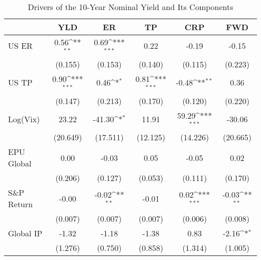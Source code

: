 \begin{table}[htbp]\centering
\def\sym#1{\ifmmode^{#1}\else\(^{#1}\)\fi}
\caption{Drivers of the 10-Year Nominal Yield and Its Components}
\label{tab:ycdcmp10y}
\begin{tabular*}{0.8\hsize}{@{\hskip\tabcolsep\extracolsep\fill}l*{5}{c}}
\toprule
                    &\multicolumn{1}{c}{YLD}&\multicolumn{1}{c}{ER}&\multicolumn{1}{c}{TP}&\multicolumn{1}{c}{CRP}&\multicolumn{1}{c}{FWD}\\
\midrule
US ER               &        0.56\sym{**} &        0.69\sym{***}&        0.22         &       -0.19         &       -0.15         \\
                    &     (0.155)         &     (0.153)         &     (0.140)         &     (0.115)         &     (0.223)         \\
\addlinespace
US TP               &        0.90\sym{***}&        0.46\sym{*}  &        0.81\sym{***}&       -0.48\sym{**} &        0.36         \\
                    &     (0.147)         &     (0.213)         &     (0.170)         &     (0.120)         &     (0.220)         \\
\addlinespace
Log(Vix)            &       23.22         &      -41.30\sym{*}  &       11.91         &       59.29\sym{***}&      -30.06         \\
                    &    (20.649)         &    (17.511)         &    (12.125)         &    (14.226)         &    (20.665)         \\
\addlinespace
EPU Global          &        0.00         &       -0.03         &        0.05         &       -0.05         &        0.02         \\
                    &     (0.206)         &     (0.127)         &     (0.053)         &     (0.111)         &     (0.170)         \\
\addlinespace
S\&P Return         &       -0.00         &       -0.02\sym{**} &       -0.01         &        0.02\sym{***}&       -0.03\sym{**} \\
                    &     (0.007)         &     (0.007)         &     (0.007)         &     (0.006)         &     (0.008)         \\
\addlinespace
Global IP           &       -1.32         &       -1.18         &       -1.38         &        0.83         &       -2.16\sym{*}  \\
                    &     (1.276)         &     (0.750)         &     (0.858)         &     (1.314)         &     (1.005)         \\

\end{tabular*}
\end{table}
